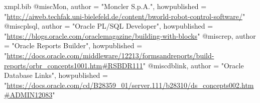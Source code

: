 \begin{filecontents*}{xmpl.bib}
@misc{Mon,
author    = "Moncler S.p.A.",
    howpublished = "\url{http://aiweb.techfak.uni-bielefeld.de/content/bworld-robot-control-software/}"
}
@misc{plsql,
author    = "Oracle PL/SQL Developer",
    howpublished = "\url{https://blogs.oracle.com/oraclemagazine/building-with-blocks}"
}
@misc{rep,
author    = "Oracle Reports Builder",
    howpublished = "\url{https://docs.oracle.com/middleware/12213/formsandreports/build-reports/orbr\_concepts1001.htm\#RSBDR111}"
}
@misc{dblink,
author    = "Oracle Database Links",
    howpublished = "\url{https://docs.oracle.com/cd/B28359\_01/server.111/b28310/ds\_concepts002.htm\#ADMIN12083}"
}
\end{filecontents*}

\documentclass[twoside,12pt]{report}

\usepackage[italian]{babel}
\usepackage[T1]{fontenc} 
\usepackage[utf8]{inputenc}

\usepackage[a4paper]{geometry}
\usepackage{lipsum} 
\usepackage{textcomp} %


\usepackage{fancyhdr} %

\usepackage{graphicx} %
\usepackage{subfig}

\usepackage{titlesec} %

\usepackage{multirow} %
\usepackage[table]{xcolor} %

\usepackage{graphbox}

\usepackage{booktabs} %

\usepackage{parskip} %

\usepackage{caption} %

\usepackage{eurosym} %

\usepackage{float} %

\usepackage{longtable} %

\usepackage{changepage} %

\usepackage{listings} %


\usepackage{tabularx} %
\usepackage{booktabs}
\usepackage{longtable}
\usepackage[toc,page]{appendix} %
\usepackage{lastpage}
\usepackage{listings}
\usepackage{comment}

\usepackage{natbib}
\usepackage[colorlinks=true,linkcolor  = black]{hyperref}%